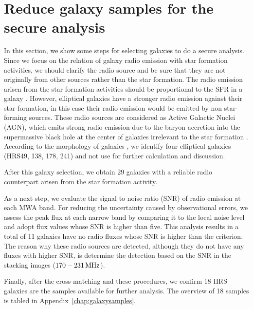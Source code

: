 \section{Reduce galaxy samples for the secure analysis}\label{sec:reducegalaxysamples}

In this section, we show some steps for selecting galaxies to do a secure analysis.
Since we focus on the relation of galaxy radio emission with star formation activities, we should clarify the radio source and be sure that they are not originally from other sources rather than the star formation.
The radio emission arisen from the star formation activities should be proportional to the SFR in a galaxy \citep{Condon1992a, Murphy2011}.
However, elliptical galaxies have a stronger radio emission against their star formation, in this case their radio emission would be emitted by non star-forming sources.
These radio sources are considered as Active Galactic Nuclei (AGN), which emits strong radio emission due to the baryon accretion into the supermassive black hole at the center of galaxies irrelevant to the star formation \citep[e.g.,][]{Urry1995, Padovani2017}.
According to the morphology of galaxies \citep{Cortese2012}, we identify four elliptical galaxies (HRS49, 138, 178, 241) and not use for further calculation and discussion.

After this galaxy selection, we obtain 29 galaxies with a reliable radio counterpart arisen from the star formation activity.

As a next step, we evaluate the signal to noise ratio (SNR) of radio emission at each MWA band.
For reducing the uncertainty caused by observational errors, we assess the peak flux at each narrow band by comparing it to the local noise level and adopt flux values whose SNR is higher than five.
This analysis results in a total of 11 galaxies have no radio fluxes whose SNR is higher than the criterion.
The reason why these radio sources are detected, although they do not have any fluxes with higher SNR, is \citet{Hurley-Walker2017a} determine the detection based on the SNR in the stacking images ($170-231\,\mathrm{MHz}$).

Finally, after the cross-matching and these procedures, we confirm 18 HRS galaxies are the samples available for further analysis.
The overview of 18 samples is tabled in Appendix~\ref{chap:galaxysamples}.



